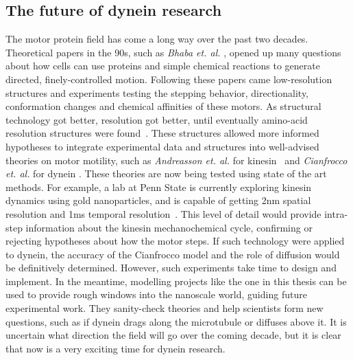 \documentclass[
11pt, %
english, %
singlespacing, %
headsepline, %
chapterinoneline, %
]{MastersDoctoralThesis} %
\begin{document}
\subsection{The future of dynein research}
The motor protein field has come a long way over the past two decades. Theoretical papers in the 90s, such as \textit{Bhaba et. al.} \cite{bhabha-paper},  opened up many questions about how cells can use proteins and simple chemical reactions to generate directed, finely-controlled motion. Following these papers came low-resolution structures and experiments testing the stepping behavior, directionality, conformation changes and chemical affinities of these motors. As structural technology got better, resolution got better, until eventually amino-acid resolution structures were found~\cite{schmidt-carter}. These structures allowed more informed hypotheses to integrate experimental data and structures into well-advised theories on motor motility, such as \textit{Andreasson et. al.} for kinesin~\cite{kinesin-cycle} and \textit{Cianfrocco et. al.} for dynein \cite{cianfroccoreview}. These theories are now being tested using state of the art methods. For example, a lab at Penn State is currently exploring kinesin dynamics using gold nanoparticles, and is capable of getting 2nm spatial resolution and 1ms temporal resolution~\cite{kinesin-gold-nanoparticle}. This level of detail would provide intra-step information about the kinesin mechanochemical cycle, confirming or rejecting hypotheses about how the motor steps. If such technology were applied to dynein, the accuracy of the Cianfrocco model and the role of diffusion would be definitively determined. However, such experiments take time to design and implement. In the meantime, modelling projects like the one in this thesis can be used to provide rough windows into the nanoscale world, guiding future experimental work. They sanity-check theories and help scientists form new questions, such as if dynein drags along the microtubule or diffuses above it. It is uncertain what direction the field will go over the coming decade, but it is clear that now is a very exciting time for dynein research.\\


\appendix %
\end{document}
